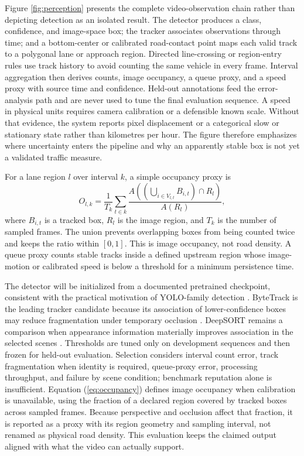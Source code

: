 Figure \ref{fig:perception} presents the complete video-observation chain rather than depicting detection as an isolated result. The detector produces a class, confidence, and image-space box; the tracker associates observations through time; and a bottom-center or calibrated road-contact point maps each valid track to a polygonal lane or approach region. Directed line-crossing or region-entry rules use track history to avoid counting the same vehicle in every frame. Interval aggregation then derives counts, image occupancy, a queue proxy, and a speed proxy with source time and confidence. Held-out annotations feed the error-analysis path and are never used to tune the final evaluation sequence. A speed in physical units requires camera calibration or a defensible known scale. Without that evidence, the system reports pixel displacement or a categorical slow or stationary state rather than kilometres per hour. The figure therefore emphasizes where uncertainty enters the pipeline and why an apparently stable box is not yet a validated traffic measure.

For a lane region $l$ over interval $k$, a simple occupancy proxy is
\begin{equation}
O_{l,k}=\frac{1}{T_k}\sum_{t\in k}\frac{A\!\left(\left(\bigcup_{i\in V_{l,t}}B_{i,t}\right)\cap R_l\right)}{A(R_l)},
\label{eq:occupancy}
\end{equation}
where $B_{i,t}$ is a tracked box, $R_l$ is the image region, and $T_k$ is the number of sampled frames. The union prevents overlapping boxes from being counted twice and keeps the ratio within $[0,1]$. This is image occupancy, not road density. A queue proxy counts stable tracks inside a defined upstream region whose image-motion or calibrated speed is below a threshold for a minimum persistence time.

The detector will be initialized from a documented pretrained checkpoint, consistent with the practical motivation of YOLO-family detection \cite{redmon2016yolo}. ByteTrack is the leading tracker candidate because its association of lower-confidence boxes may reduce fragmentation under temporary occlusion \cite{zhang2022bytetrack}. DeepSORT remains a comparison when appearance information materially improves association in the selected scenes \cite{wojke2017deepsort}. Thresholds are tuned only on development sequences and then frozen for held-out evaluation. Selection considers interval count error, track fragmentation when identity is required, queue-proxy error, processing throughput, and failure by scene condition; benchmark reputation alone is insufficient. Equation (\ref{eq:occupancy}) defines image occupancy when calibration is unavailable, using the fraction of a declared region covered by tracked boxes across sampled frames. Because perspective and occlusion affect that fraction, it is reported as a proxy with its region geometry and sampling interval, not renamed as physical road density. This evaluation keeps the claimed output aligned with what the video can actually support.

